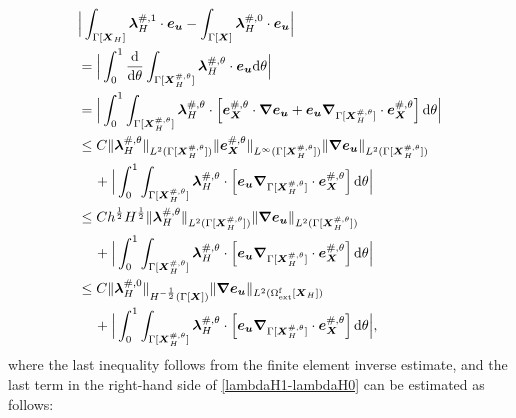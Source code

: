 \documentclass[11pt,reqno]{amsart}
\theoremstyle{definition}
\theoremstyle{plain}
\numberwithin{theorem}{section}
\numberwithin{proposition}{section}
\numberwithin{lemma}{section}
\numberwithin{equation}{section}
\newcommand{\bs}[1]{\boldsymbol{#1}}
\newcommand{\uu}[1]  {{\bs{#1}} }
\newcommand{\grad}   { \uu{\nabla}    }
\def\d{\mathrm{d}}
\renewcommand{\(}{\bigl(}
\renewcommand{\)}{\bigr)}
\begin{document}
\begin{align}\label{lambdaH1-lambdaH0}
&\Big| \int_{\Gamma[\bs X_H]} \bs \lambda_H^{\#,1} \cdot {\bs e}_{\bs u} 
- \int_{\Gamma[\bs X]} \bs \lambda_H^{\#,0} \cdot {\bs e}_{\bs u} \Big|  \notag \\
& = \Big| \int_0^1 \frac{\d}{\d\theta}\int_{\Gamma[{\bs X}_H^{\#,\theta}]} \bs \lambda_H^{\#,\theta} \cdot {\bs e}_{\bs u}  \d\theta  \Big|  \notag \\
& = \Big| \int_0^1 \int_{\Gamma[{\bs X}_H^{\#,\theta}]} \bs \lambda_H^{\#,\theta} \cdot 
\Big[{\bs e}_{\bs X}^{\#,\theta} \cdot \grad {\bs e}_{\bs u}+  {\bs e}_{\bs u}  \grad_{\Gamma[{\bs X}_H^{\#,\theta}]}\cdot {\bs e}_{\bs X}^{\#,\theta} \Big] \, \d\theta  \Big|  \notag \\
& \le C \| {\bs\lambda}_H^{\#,\theta} \|_{L^2(\Gamma[{\bs X}_H^{\#,\theta}])} \|{\bs e}_{\bs X}^{\#,\theta} \|_{L^\infty(\Gamma[{\bs X}_H^{\#,\theta}])} \| \grad {\bs e}_{\bs u} \|_{L^2(\Gamma[{\bs X}_H^{\#,\theta}])} \notag\\
&\quad\, 
+ \Big| \int_0^1 \int_{\Gamma[{\bs X}_H^{\#,\theta}]} \bs \lambda_H^{\#,\theta}\cdot 
\Big[ {\bs e}_{\bs u}  \grad_{\Gamma[{\bs X}_H^{\#,\theta}]}\cdot {\bs e}_{\bs X}^{\#,\theta}\Big] \, \d\theta  \Big|  \notag\\
& \le C h^{\frac12} H^{\frac12} \| {\bs\lambda}_H^{\#,\theta} \|_{L^2(\Gamma[{\bs X}_H^{\#,\theta}])} \| \grad {\bs e}_{\bs u} \|_{L^2(\Gamma[{\bs X}_H^{\#,\theta}])} \notag\\
&\quad\, 
+ \Big| \int_0^1 \int_{\Gamma[{\bs X}_H^{\#,\theta}]} \bs \lambda_H^{\#,\theta} \cdot 
\Big[ {\bs e}_{\bs u}  \grad_{\Gamma[{\bs X}_H^{\#,\theta}]}\cdot {\bs e}_{\bs X}^{\#,\theta} \Big] \, \d\theta  \Big|  \notag\\
& \le C \| {\bs\lambda}_H^{\#,0} \|_{H^{-\frac12}(\Gamma[\bs X])} \| \grad {\bs e}_{\bs u} \|_{L^2(\Omega^{\rm f}_{\rm ext}[\bs  X_H])} \notag\\
&\quad\, 
+ \Big| \int_0^1 \int_{\Gamma[{\bs X}_H^{\#,\theta}]} \bs \lambda_H^{\#,\theta} \cdot 
\Big[ {\bs e}_{\bs u}  \grad_{\Gamma[{\bs X}_H^{\#,\theta}]}\cdot {\bs e}_{\bs X}^{\#,\theta} \Big] \, \d\theta  \Big|, 
\end{align} 
where the last inequality follows from the finite element inverse estimate, and the last term in the right-hand side of \eqref{lambdaH1-lambdaH0} can be estimated as follows: 
\end{document}
